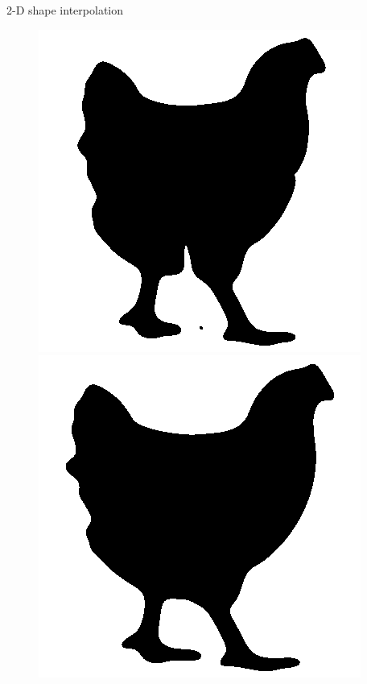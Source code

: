 \begin{frame}{2-D shape interpolation}
\begin{figure}
\begin{minipage}[t]{0.08\linewidth}
        \end{minipage}
        \hfill
        \begin{minipage}[t]{0.08\linewidth}
            \vspace{0pt}
            \centering
            \includegraphics[width=\textwidth]{png/kun-chicken/shape-1-9.png}
        \end{minipage}
        \hfill
        \begin{minipage}[t]{0.08\linewidth}
            \vspace{0pt}
            \centering
            \includegraphics[width=\textwidth]{png/kun-chicken/shape-1-10.png}
        \end{minipage}
        

\end{figure}
\end{frame}
